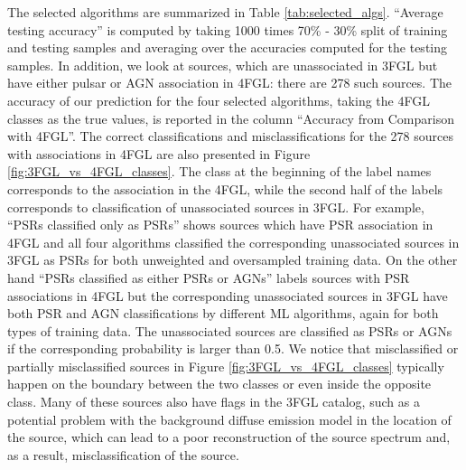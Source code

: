 The selected algorithms are summarized in Table \ref{tab:selected_algs}.
``Average testing accuracy'' is computed by taking 1000 times 70\% - 30\% split of training and testing samples and averaging over the 
accuracies computed for the testing samples.
In addition, we look at sources, which are unassociated in 3FGL but have either pulsar or AGN association in 4FGL: there are 278 such sources.
The accuracy of our prediction for the four selected algorithms, taking the 4FGL classes as the true values, is reported in the column ``Accuracy from Comparison with 4FGL''.
The correct classifications and misclassifications for the 278 sources with associations in 4FGL are also presented in Figure \ref{fig:3FGL_vs_4FGL_classes}.
The class at the beginning of the label names corresponds to the association in the 4FGL, while the second half of the labels corresponds to classification of unassociated sources in 3FGL. For example, ``PSRs classified only as PSRs'' shows sources which have PSR association in 4FGL and all four algorithms classified the corresponding unassociated sources in 3FGL as PSRs for both unweighted and oversampled training data. On the other hand ``PSRs classified as either PSRs or AGNs'' labels sources with PSR associations in 4FGL but the corresponding unassociated sources in 3FGL have both PSR and AGN classifications by different ML algorithms, again for both types of training data.
The unassociated sources are classified as PSRs or AGNs if the corresponding probability is larger than 0.5.
We notice that misclassified or partially misclassified sources in Figure \ref{fig:3FGL_vs_4FGL_classes} typically happen on the boundary between the two classes or even inside the opposite class.
Many of these sources also have flags in the 3FGL catalog, such as a potential problem with the background diffuse emission model in the location of the source, which can lead to a poor reconstruction of the source spectrum and, as a result, misclassification of the source.




